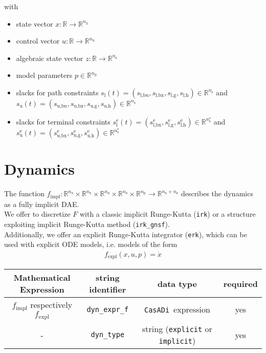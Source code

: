\documentclass{article}
\newcommand{\code}[1]{\texttt{#1}}
\newcommand{\casadi}{\texttt{CasADi}}
\newcommand{\ind}[1]{_{\textrm{#1}}}
\newcommand{\terminal}{^{\textrm{e}}}
\newcommand{\Lower}{\ind{l}}
\newcommand{\lowerh}{\ind{l,h}}
\newcommand{\lowerbx}{\ind{l,bx}}
\newcommand{\lowerbu}{\ind{l,bu}}
\newcommand{\lowerg}{\ind{l,g}}
\newcommand{\upper}{\ind{u}}
\newcommand{\upperh}{\ind{u,h}}
\newcommand{\upperbx}{\ind{u,bx}}
\newcommand{\upperbu}{\ind{u,bu}}
\newcommand{\upperg}{\ind{u,g}}
\newcommand{\R}{\mathbb{R}}
\newcommand{\nx}{n\ind{x}}
\newcommand{\nuu}{n\ind{u}}
\newcommand{\nz}{n\ind{z}}
\newcommand{\np}{n\ind{p}}
\newcommand{\ns}{n\ind{s}}
\begin{document}
with
\begin{itemize}
\item state vector $ x: \R \rightarrow \R^{\nx} $
\item control vector $ u: \R \rightarrow \R^{\nuu} $
\item algebraic state vector $ z: \R \rightarrow \R^{\nz} $
\item model parameters $ p \in \R^{\np} $
\item slacks for path constraints $ s\Lower(t) = (s\lowerbu, s\lowerbx, s\lowerg, s\lowerh) \in \R^{\ns} $ and $ s\upper(t) = (s\upperbu, s\upperbx, s\upperg, s\upperh) \in \R^{\ns} $
\item slacks for terminal constraints $ s\Lower\terminal(t) = (s\lowerbx\terminal, s\lowerg\terminal, s\lowerh\terminal) \in \R^{\ns\terminal} $ and $ s\upper\terminal(t) = (s\upperbx\terminal, s\upperg\terminal, s\upperh\terminal) \in \R^{\ns\terminal} $
\end{itemize}


\section{Dynamics}
The function $ f\ind{impl}: \mathbb{R}^{\nx}\times\mathbb{R}^{\nx}\times\mathbb{R}^{\nuu}\times\mathbb{R}^{\nz}\times\mathbb{R}^{\np} \rightarrow \mathbb{R}^{\nx+\nz}$ describes the dynamics as a fully implicit DAE.\\
We offer to discretize $ F $ with a classic implicit Runge-Kutta (\code{irk}) or a structure exploiting implicit Runge-Kutta method (\code{irk\_gnsf}).\\
Additionally, we offer an explicit Runge-Kutta integrator (\code{erk}), which can be used with explicit ODE models, i.e. models of the form
\begin{align*}
f\ind{expl}(x,u,p) = \dot{x}
\end{align*}

\newcommand{\mandatory}{yes}
\newcommand{\optional}{no}
\begin{table}[h!]
	\centering
	\begin{tabular}{|c|c|c|c|}
		\toprule
		Mathematical Expression & string identifier & data type & required \\ \midrule
		$ f\ind{impl} $ respectively $ f\ind{expl} $ & \code{dyn\_expr\_f}    & \casadi~expression & \mandatory \\ \midrule
		- & \code{dyn\_type}    & string (\code{explicit} or \code{implicit}) & \mandatory \\
		\bottomrule
	\end{tabular}
\end{table}
\end{document}
